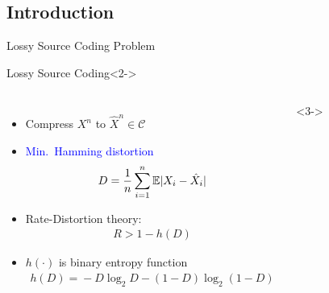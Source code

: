 \documentclass[10pt]{beamer}
\newcommand{\expt}{\mathbb{E}}
\newlength\tikzwidth
\newlength\tikzheight
\begin{document}
\subsection{Introduction}
\begin{frame}{Lossy Source Coding Problem}
  \begin{block}{Lossy Source Coding}<2->
    \begin{columns}
      \begin{itemize}
      \item<2-> Compress $X^n$ to $\hat{X}^n \in \mathcal{C}$
      \item<2-> \textcolor{blue}{Min.~Hamming distortion}
        \begin{align*}
          D=\frac{1}{n} \sum_{i=1}^n \expt \abs{X_i-\hat{X}_i}
        \end{align*}
      \item<3-> Rate-Distortion theory: \vspace{-0.15cm}
        \begin{align*}
          R > 1 - h(D)
        \end{align*}
        \vspace{-0.5cm}
      \item<3-> $h(\cdot)$ is binary entropy function
        \small{
          \begin{align*}
            h(D)\!=\!-D \log_2 D \!-\! (1\!-\!D) \log_2 (1-D)
          \end{align*}
        }
      \end{itemize}
      <3->
      \setlength\tikzheight{3cm} 
      \setlength\tikzwidth{3.5cm} 
      \centering{}
    \end{columns}
  \end{block}

\end{frame}
\end{document}
